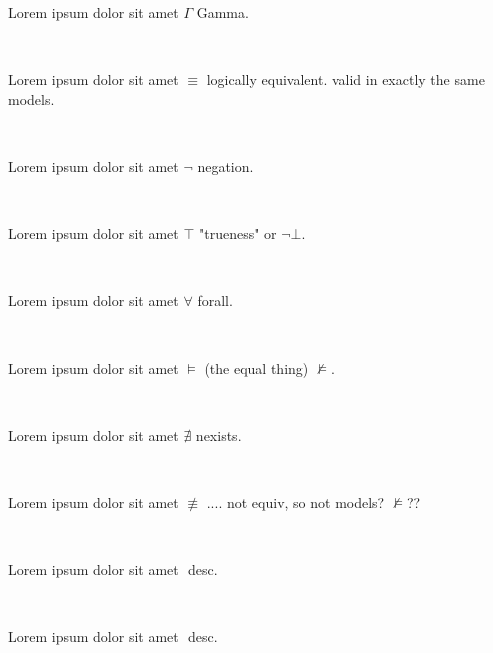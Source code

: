 \documentclass[12pt]{article}
\begin{document}
Lorem ipsum dolor sit amet $ \Gamma $ Gamma.

\centerline{~}

Lorem ipsum dolor sit amet $ \equiv $ logically equivalent. valid in exactly the same models.

\centerline{~}

Lorem ipsum dolor sit amet $ \neg $ negation.

\centerline{~}

Lorem ipsum dolor sit amet $ \top $ "trueness" or $ \neg \bot $.

\centerline{~}

Lorem ipsum dolor sit amet $ \forall $ forall.

\centerline{~}

Lorem ipsum dolor sit amet $ \models $ (the equal thing) $ \nvDash $.

\centerline{~}

Lorem ipsum dolor sit amet $ \nexists $ nexists.

\centerline{~}

Lorem ipsum dolor sit amet $ \not\equiv $ .... not equiv, so not models? $ \not\models $??

\centerline{~}

Lorem ipsum dolor sit amet $  $ desc.

\centerline{~}

Lorem ipsum dolor sit amet $  $ desc.

\centerline{~}
\end{document}
